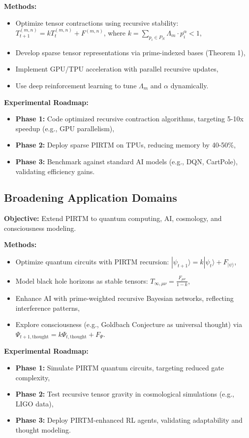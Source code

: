 \documentclass{article}
\theoremstyle{plain}
\begin{document}
\textbf{Methods:}
\begin{itemize}
    \item Optimize tensor contractions using recursive stability: \( T_{t+1}^{(m,n)} = k T_t^{(m,n)} + F^{(m,n)} \), where \( k = \sum_{p_i \in P_N} \Lambda_m \cdot p_i^\alpha < 1 \),
    \item Develop sparse tensor representations via prime-indexed bases (Theorem 1),
    \item Implement GPU/TPU acceleration with parallel recursive updates,
    \item Use deep reinforcement learning to tune \( \Lambda_m \) and \( \alpha \) dynamically.
\end{itemize}

\textbf{Experimental Roadmap:}
\begin{itemize}
    \item \textbf{Phase 1:} Code optimized recursive contraction algorithms, targeting 5-10x speedup (e.g., GPU parallelism),
    \item \textbf{Phase 2:} Deploy sparse PIRTM on TPUs, reducing memory by 40-50\%,
    \item \textbf{Phase 3:} Benchmark against standard AI models (e.g., DQN, CartPole), validating efficiency gains.
\end{itemize}

\subsection{Broadening Application Domains}
\textbf{Objective:} Extend PIRTM to quantum computing, AI, cosmology, and consciousness modeling.

\textbf{Methods:}
\begin{itemize}
    \item Optimize quantum circuits with PIRTM recursion: \( |\psi_{t+1}\rangle = k |\psi_t\rangle + F_{|\psi\rangle} \),
    \item Model black hole horizons as stable tensors: \( T_{\infty,\mu\nu} = \frac{F_{\mu\nu}}{1 - k} \),
    \item Enhance AI with prime-weighted recursive Bayesian networks, reflecting interference patterns,
    \item Explore consciousness (e.g., Goldbach Conjecture as universal thought) via \( \Psi_{t+1,\text{thought}} = k \Psi_{t,\text{thought}} + F_{\Psi} \).
\end{itemize}

\textbf{Experimental Roadmap:}
\begin{itemize}
    \item \textbf{Phase 1:} Simulate PIRTM quantum circuits, targeting reduced gate complexity,
    \item \textbf{Phase 2:} Test recursive tensor gravity in cosmological simulations (e.g., LIGO data),
    \item \textbf{Phase 3:} Deploy PIRTM-enhanced RL agents, validating adaptability and thought modeling.
\end{itemize}
\end{document}
